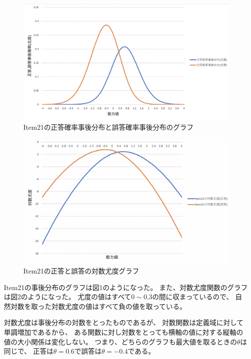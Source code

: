 \documentclass[12pt]{jarticle}
\begin{document}
\begin{figure}[h]
    \begin{center}
        \includegraphics[scale=0.3]{kadai5_3_1.png}
    \end{center}
    \caption{Item21の正答確率事後分布と誤答確率事後分布のグラフ}
\end{figure}

\begin{figure}[h]
    \begin{center}
        \includegraphics[scale=0.3]{kadai5_3_2.png}
    \end{center}
    \caption{Item21の正答と誤答の対数尤度グラフ}
\end{figure}

\clearpage

Item21の事後分布のグラフは図1のようになった。
また、対数尤度関数のグラフは図2のようになった。
尤度の値はすべて$0\sim 0.3$の間に収まっているので、
自然対数を取った対数尤度の値はすべて負の値を取っている。

対数尤度は事後分布の対数をとったものであるが、
対数関数は定義域に対して単調増加であるから、
ある関数に対し対数をとっても横軸の値に対する縦軸の値の大小関係は変化しない。
つまり、どちらのグラフも最大値を取るときの$\theta$は同じで、
正答は$\theta=0.6$で誤答は$\theta=-0.4$である。
\end{document}
